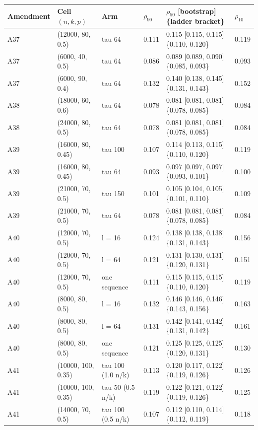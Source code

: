 \begin{tabular}{llllll}
\toprule
Amendment & Cell $(n,k,p)$ & Arm & $\rho_{90}$ & $\rho_{50}$ [bootstrap] \{ladder bracket\} & $\rho_{10}$ \\
\midrule
A37 & (12000, 80, 0.5) & tau 64 & 0.111 & 0.115 [0.115, 0.115] \{0.110, 0.120\} & 0.119 \\
A37 & (6000, 40, 0.5) & tau 64 & 0.086 & 0.089 [0.089, 0.090] \{0.085, 0.093\} & 0.093 \\
A37 & (6000, 90, 0.4) & tau 64 & 0.132 & 0.140 [0.138, 0.145] \{0.131, 0.143\} & 0.152 \\
A38 & (18000, 60, 0.6) & tau 64 & 0.078 & 0.081 [0.081, 0.081] \{0.078, 0.085\} & 0.084 \\
A38 & (24000, 80, 0.5) & tau 64 & 0.078 & 0.081 [0.081, 0.081] \{0.078, 0.085\} & 0.084 \\
A39 & (16000, 80, 0.45) & tau 100 & 0.107 & 0.114 [0.113, 0.115] \{0.110, 0.120\} & 0.119 \\
A39 & (16000, 80, 0.45) & tau 64 & 0.093 & 0.097 [0.097, 0.097] \{0.093, 0.101\} & 0.100 \\
A39 & (21000, 70, 0.5) & tau 150 & 0.101 & 0.105 [0.104, 0.105] \{0.101, 0.110\} & 0.109 \\
A39 & (21000, 70, 0.5) & tau 64 & 0.078 & 0.081 [0.081, 0.081] \{0.078, 0.085\} & 0.084 \\
A40 & (12000, 70, 0.5) & l = 16 & 0.124 & 0.138 [0.138, 0.138] \{0.131, 0.143\} & 0.156 \\
A40 & (12000, 70, 0.5) & l = 64 & 0.121 & 0.131 [0.130, 0.131] \{0.120, 0.131\} & 0.151 \\
A40 & (12000, 70, 0.5) & one sequence & 0.111 & 0.115 [0.115, 0.115] \{0.110, 0.120\} & 0.119 \\
A40 & (8000, 80, 0.5) & l = 16 & 0.132 & 0.146 [0.146, 0.146] \{0.143, 0.156\} & 0.163 \\
A40 & (8000, 80, 0.5) & l = 64 & 0.131 & 0.142 [0.141, 0.142] \{0.131, 0.142\} & 0.161 \\
A40 & (8000, 80, 0.5) & one sequence & 0.121 & 0.125 [0.125, 0.125] \{0.120, 0.131\} & 0.130 \\
A41 & (10000, 100, 0.35) & tau 100 (1.0 n/k) & 0.113 & 0.120 [0.117, 0.122] \{0.119, 0.126\} & 0.126 \\
A41 & (10000, 100, 0.35) & tau 50 (0.5 n/k) & 0.119 & 0.122 [0.121, 0.122] \{0.119, 0.126\} & 0.125 \\
A41 & (14000, 70, 0.5) & tau 100 (0.5 n/k) & 0.107 & 0.112 [0.110, 0.114] \{0.112, 0.119\} & 0.118 \\

\end{tabular}
